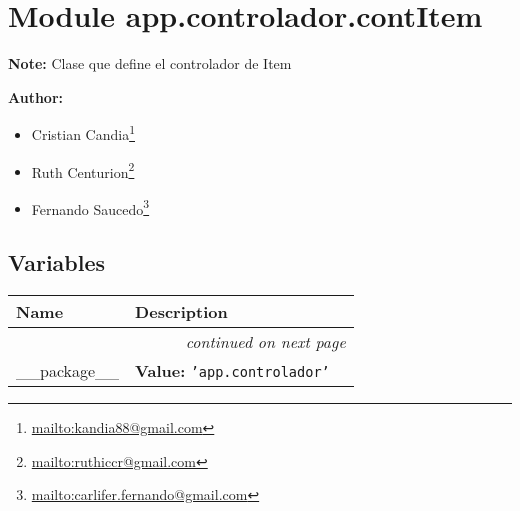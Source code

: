 %
%
%


\section{Module app.controlador.contItem}

    \label{app:controlador:contItem}
\textbf{Note:} Clase que define el controlador de Item



\textbf{Author:} \begin{itemize}
\setlength{\parskip}{0.6ex}
  \item Cristian 
    Candia\footnote{\href{mailto:kandia88@gmail.com}{mailto:kandia88@gmail.com}}

  \item Ruth 
    Centurion\footnote{\href{mailto:ruthiccr@gmail.com}{mailto:ruthiccr@gmail.com}}

  \item Fernando 
    Saucedo\footnote{\href{mailto:carlifer.fernando@gmail.com}{mailto:carlifer.fernando@gmail.com}}

\end{itemize}





  \subsection{Variables}

    \vspace{-1cm}
\hspace{\varindent}\begin{longtable}{|p{\varnamewidth}|p{\vardescrwidth}|l}
\cline{1-2}
\cline{1-2} \centering \textbf{Name} & \centering \textbf{Description}& \\
\cline{1-2}
\endhead\cline{1-2}\multicolumn{3}{r}{\small\textit{continued on next page}}\\\endfoot\cline{1-2}
\endlastfoot\raggedright \_\-\_\-p\-a\-c\-k\-a\-g\-e\-\_\-\_\- & \raggedright \textbf{Value:} 
{\tt \texttt{'}\texttt{app.controlador}\texttt{'}}&\\
\cline{1-2}
\end{longtable}


